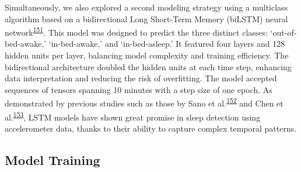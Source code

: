 \documentclass[
  10pt,
]{scrbook}
\begin{document}
Simultaneously, we also explored a second modeling strategy using a
multiclass algorithm based on a bidirectional Long Short-Term Memory
(biLSTM) neural
network\textsuperscript{\protect\hyperlink{ref-hochreiter_long_1997}{151}}.
This model was designed to predict the three distinct classes:
`out-of-bed-awake,' `in-bed-awake,' and `in-bed-asleep.' It featured
four layers and 128 hidden units per layer, balancing model complexity
and training efficiency. The bidirectional architecture doubled the
hidden units at each time step, enhancing data interpretation and
reducing the risk of overfitting. The model accepted sequences of
tensors spanning 10 minutes with a step size of one epoch. As
demonstrated by previous studies such as those by Sano et
al.\textsuperscript{\protect\hyperlink{ref-sano_multimodal_2019}{152}}
and Chen et
al.\textsuperscript{\protect\hyperlink{ref-chen_attention_2021}{153}},
LSTM models have shown great promise in sleep detection using
accelerometer data, thanks to their ability to capture complex temporal
patterns.

\hypertarget{model-training}{%
\subsection{Model Training}\label{model-training}}
\end{document}
